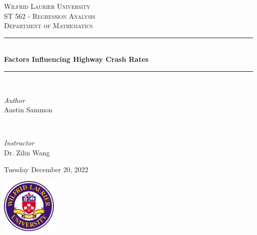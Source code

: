 \documentclass[12pt]{report}
\begin{document}
\newtheorem{thm}{Theorem}[section] 
\newtheorem{defn}[thm]{Definition} 
\newtheorem{ex}[thm]{Example}
\newtheorem{pro}[thm] {Proof}
\newtheorem{cor}[thm] {Corollary}
\newtheorem{lem}[thm] {Lemma}
\newtheorem{rmk}[thm] {Remark} 
\newtheorem{prop} [thm] {Proposition}

\begin{titlepage} 
	\newcommand{\HRule}{\rule{\linewidth}{0.5mm}} 
	\center 
	
	\textsc{\LARGE Wilfrid Laurier University}\\[1.5cm] %
	
	\textsc{\Large ST 562 - Regression Analysis}\\[0.5cm] %
	
	\textsc{\large Department of Mathematics}\\[0.5cm] %
	
	\HRule\\[0.4cm]
	{\huge\bfseries Factors Influencing Highway Crash Rates}\\[0.4cm] %
	
	\HRule\\[1.5cm]
	\begin{minipage}{0.4\textwidth}
		\begin{flushleft}
			\large
			\textit{Author}\\
			Austin Sammon %
		\end{flushleft}
	\end{minipage}
	~
	\begin{minipage}{0.4\textwidth}
		\begin{flushright}
			\large
			\textit{Instructor}\\
			Dr. Zilin Wang %
		\end{flushright}
	\end{minipage}
	\vfill\vfill\vfill
	
	{\large Tuesday December 20, 2022} %
	
	\vfill\vfill\vfill
	\includegraphics[width=0.2\textwidth]{Wlu_colour_logo.jpg}\\[0.1cm] 
	
	\vfill
	
\end{titlepage}
\end{document}
